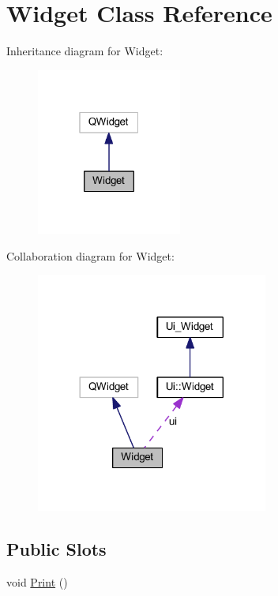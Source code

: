 \hypertarget{class_widget}{}\section{Widget Class Reference}
\label{class_widget}


Inheritance diagram for Widget:\nopagebreak
\begin{figure}[H]
\begin{center}
\leavevmode
\includegraphics[width=135pt]{class_widget__inherit__graph}
\end{center}
\end{figure}


Collaboration diagram for Widget:
\nopagebreak
\begin{figure}[H]
\begin{center}
\leavevmode
\includegraphics[width=216pt]{class_widget__coll__graph}
\end{center}
\end{figure}
\subsection*{Public Slots}
\begin{DoxyCompactItemize}
\item 
void \hyperlink{class_widget_adafcde4720aa7cb21f5d8966ae03c08c}{Print} ()
\end{DoxyCompactItemize}
